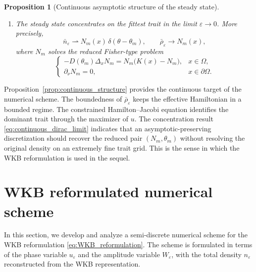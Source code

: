 \documentclass[11pt]{article}
\newtheorem{proposition}{Proposition}[section]
\newtheorem{remark}{Remark}[section]
\begin{document}
\begin{proposition}[Continuous asymptotic structure of the steady state]
\begin{enumerate}
\item The steady state concentrates on the fittest trait in the limit \(\varepsilon\to0\). More precisely,
\begin{equation}\label{eq:continuous_dirac_limit}
\bar n_\varepsilon \rightharpoonup N_m(x)\,\delta(\theta-\theta_m),
\qquad
\bar\rho_\varepsilon \to N_m(x),
\end{equation}
where \(N_m\) solves the reduced Fisher-type problem
\begin{equation}\label{eq:Nm_problem}
\begin{cases}
-D(\theta_m)\Delta_x N_m = N_m\bigl(K(x)-N_m\bigr), & x\in\Omega,\\
\partial_\nu N_m = 0, & x\in\partial\Omega.
\end{cases}
\end{equation}
\end{enumerate}
\end{proposition}

Proposition~\ref{prop:continuous_structure} provides the continuous target of the numerical scheme. The boundedness of \(\bar\rho_\varepsilon\) keeps the effective Hamiltonian in a bounded regime. The constrained Hamilton--Jacobi equation identifies the dominant trait through the maximizer of \(u\). The concentration result \eqref{eq:continuous_dirac_limit} indicates that an asymptotic-preserving discretization should recover the reduced pair \((N_m,\theta_m)\) without resolving the original density on an extremely fine trait grid. This is the sense in which the WKB reformulation is used in the sequel.



\section{WKB reformulated numerical scheme}

In this section, we develop and analyze a semi-discrete numerical scheme for
the WKB reformulation \eqref{eq:WKB_reformulation}. The scheme is formulated
in terms of the phase variable \(u_\varepsilon\) and the amplitude variable
\(W_\varepsilon\), with the total density \(n_\varepsilon\) reconstructed from
the WKB representation.
\end{document}
